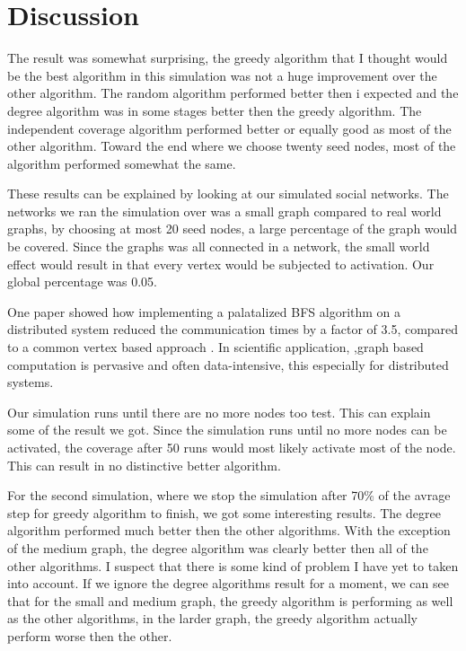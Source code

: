\chapter{Discussion} \label{discussion}
The result was somewhat surprising, the greedy algorithm that I thought would be the best algorithm in this simulation was not a huge improvement over the other algorithm. The random algorithm performed better then i expected and the degree algorithm was in some stages better then the greedy algorithm. The independent coverage algorithm performed better or equally good as most of the other algorithm. Toward the end where we choose twenty seed nodes, most of the algorithm performed somewhat the same.

These results can be explained by looking at our simulated social networks. The networks we ran the simulation over was a small graph compared to real world graphs, by choosing at most 20 seed nodes, a large percentage of the graph would be covered. Since the graphs was all connected in a network, the small world effect would result in that every vertex would be subjected to activation. Our global percentage was 0.05. 

One paper showed how implementing a palatalized BFS algorithm on a distributed system reduced the communication times by a factor of 3.5, compared to a common vertex based approach \cite{ParallelBFS2011}.  In scientific application, ,graph based computation is pervasive and often data-intensive, this especially for distributed systems. 

Our simulation runs until there are no more nodes too test. This can explain some of the result we got. Since the simulation runs until no more nodes can be activated, the coverage after 50 runs would most likely activate most of the node. This can result in no distinctive better algorithm. 

For the second simulation, where we stop the simulation after 70\% of the avrage step for greedy algorithm to finish, we got some interesting results. The degree algorithm performed much better then the other algorithms. With the exception of the medium graph, the degree algorithm was clearly better then all of the other algorithms. I suspect that there is some kind of problem I have yet to taken into account. If we ignore the degree algorithms result for a moment, we can see that for the small and medium graph, the greedy algorithm is performing as well as the other algorithms, in the larder graph, the greedy algorithm actually perform worse then the other.

